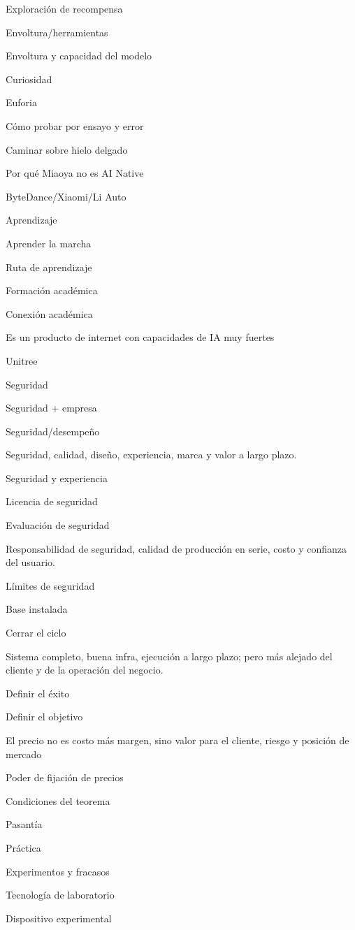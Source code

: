 \documentclass{article}
\begin{document}
Exploración de recompensa

Envoltura/herramientas

Envoltura y capacidad del modelo

Curiosidad

Euforia

Cómo probar por ensayo y error

Caminar sobre hielo delgado

Por qué Miaoya no es AI Native

ByteDance/Xiaomi/Li Auto

Aprendizaje

Aprender la marcha

Ruta de aprendizaje

Formación académica

Conexión académica

Es un producto de internet con capacidades de IA muy fuertes

Unitree

Seguridad

Seguridad + empresa

Seguridad/desempeño

Seguridad, calidad, diseño, experiencia, marca y valor a largo plazo.

Seguridad y experiencia

Licencia de seguridad

Evaluación de seguridad

Responsabilidad de seguridad, calidad de producción en serie, costo y confianza del usuario.

Límites de seguridad

Base instalada

Cerrar el ciclo

Sistema completo, buena infra, ejecución a largo plazo; pero más alejado del cliente y de la operación del negocio.

Definir el éxito

Definir el objetivo

El precio no es costo más margen, sino valor para el cliente, riesgo y posición de mercado

Poder de fijación de precios

Condiciones del teorema

Pasantía

Práctica

Experimentos y fracasos

Tecnología de laboratorio

Dispositivo experimental
\end{document}
